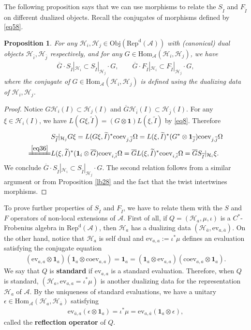 \documentclass[12pt,a4paper]{article}
\theoremstyle{definition}
\theoremstyle{plain}
\newtheorem{pp}[df]{Proposition}
\newcommand{\mc}{\mathcal}
\newcommand{\wtd}{\widetilde}
\newcommand{\ovl}{\overline}
\newcommand{\id}{\mathbf{1}}
\newcommand{\Hom}{\mathrm{Hom}}
\newcommand{\ev}{\mathrm{ev}}
\newcommand{\coev}{\mathrm{coev}}
\newcommand{\RepdA}{\mathrm{Rep}^{\mathrm d}(\mc A)}
\newcommand{\Obj}{\mathrm{Obj}}
\numberwithin{equation}{section}
\begin{document}
The following proposition says that we can use morphisms to relate the $S_{\wtd I}$ and $F_{\wtd I}$ on different dualized objects. Recall the conjugates of morphisms defined by \eqref{eq58}.


\begin{pp}\label{lb32}
For any $\mc H_i,\mc H_j\in\Obj(\RepdA)$ with (canonical) dual objects $\mc H_{\ovl i},\mc H_{\ovl j}$ respectively,  and for any $G\in\Hom_{\mc A}(\mc H_i,\mc H_j)$, we have
\begin{align*}
\ovl G\cdot S_{\wtd I}|_{\mc H_i}\subset S_{\wtd I}|_{\mc H_j}\cdot G,\qquad \ovl G\cdot F_{\wtd I}|_{\mc H_i}\subset F_{\wtd I}|_{\mc H_j}\cdot G,
\end{align*}
where the conjugate  of $G\in\Hom_{\mc A}(\mc H_i,\mc H_j)$ is defined using the dualizing data of $\mc H_i,\mc H_j$.
\end{pp}


\begin{proof}
Notice $G\mc H_i(I)\subset\mc H_j(I)$ and $\ovl G\mc H_{\ovl i}(I)\subset\mc H_{\ovl j}(I)$. For any $\xi\in\mc H_i(I)$, we have $L(G\xi,\wtd I)=(G\otimes\id)L(\xi,\wtd I)$ by \eqref{eq8}. Therefore
\begin{align*}
	&S_{\wtd I}|_{\mc H_j}G\xi=L(G\xi,\wtd I)^*\coev_{j,\ovl j}\Omega=L(\xi,\wtd I)^*(G^*\otimes\id_{\ovl j})\coev_{j,\ovl j}\Omega\\
	\xlongequal{\eqref{eq36}}&L(\xi,\wtd I)^*(\id_i\otimes\ovl G)\coev_{i,\ovl i}\Omega=\ovl GL(\xi,\wtd I)^*\coev_{i,\ovl i}\Omega=\ovl G S_{\wtd I}|_{\mc H_i}\xi.
\end{align*}
We conclude $\ovl G\cdot S_{\wtd I}|_{\mc H_i}\subset S_{\wtd I}|_{\mc H_j}\cdot G$. The second relation follows from a similar argument or from Proposition \ref{lb28} and the fact that the twist intertwines morphisms.
\end{proof}



To prove further properties of $S_{\wtd I}$ and $F_{\wtd I}$, we have to relate them with the $S$ and $F$ operators of non-local extensions of $\mc A$. First of all, if $Q=(\mc H_a,\mu,\iota)$ is a $C^*$-Frobenius algebra in $\RepdA$, then $\mc H_a$ has a dualizing data $(\mc H_{\ovl a},\ev_{a,\ovl a})$. On the other hand, notice that $\mc H_a$ is self dual and $\ev_{a,a}:=\iota^*\mu$ defines an evaluation satisfying the conjugate equation
\begin{align*}
(\ev_{a,a}\otimes\id_a)(\id_a\otimes\coev_{a,a})=\id_a=(\id_a\otimes\ev_{a,a})(\coev_{a,a}\otimes\id_a).
\end{align*}
We say that $Q$ is \textbf{standard} if $\ev_{a,a}$ is a standard evaluation. Therefore, when $Q$ is standard,  $(\mc H_a,\ev_{a,a}=\iota^*\mu)$ is another dualizing data for the representation $\mc H_a$ of $\mc A$. By the uniqueness of standard evaluations, we have a unitary $\epsilon\in\Hom_{\mc A}(\mc H_a,\mc H_{\ovl a})$ satisfying
\begin{align}
	\ev_{\ovl a,a}(\epsilon\otimes\id_a)=\iota^*\mu=\ev_{a,\ovl a}(\id_a\otimes\epsilon),\label{eq18}
\end{align}
called the \textbf{reflection operator} of $Q$.
\end{document}
